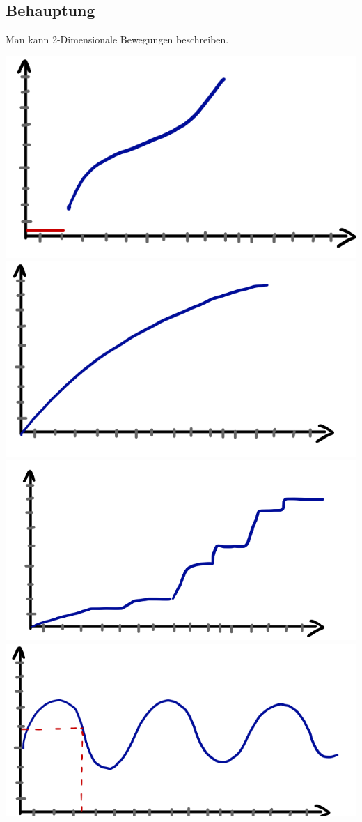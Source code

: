 \documentclass[11pt]{article}
\begin{document}
  \subsection{Behauptung}
  Man kann 2-Dimensionale Bewegungen beschreiben.
  	\begin{center}
  		\includegraphics[scale=0.3]{20190411_073844099_iOS.png}
  		\includegraphics[scale=0.3]{20190411_074045495_iOS.png}
  		\includegraphics[scale=0.3]{20190411_074437642_iOS.png}
  		\includegraphics[scale=0.3]{20190411_074619898_iOS.png}\\

\end{center}
\end{document}
